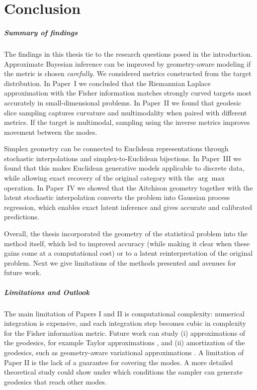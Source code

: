 \chapter{Conclusion}

\paragraph{Summary of findings}
The findings in this thesis tie to the research questions posed in the introduction. Approximate Bayesian inference can be improved by geometry-aware modeling if the metric is chosen \emph{carefully}. We considered metrics constructed from the target distribution.
In Paper~I we concluded that the Riemannian Laplace approximation with the Fisher information matches strongly curved targets most accurately in small-dimensional problems.
In Paper~II we found that geodesic slice sampling captures curvature and multimodality when paired with different metrics. 
If the target is multimodal, sampling using the inverse metrics improves movement between the modes.

Simplex geometry can be connected to Euclidean representations through stochastic interpolations and simplex-to-Euclidean bijections. In Paper~III we found that this makes Euclidean generative models applicable to discrete data, while allowing exact recovery of the original category with the $\arg\max$ operation.
In Paper~IV we showed that the Aitchison geometry together with the latent stochastic interpolation converts the problem into Gaussian process regression, which enables exact latent inference and gives accurate and calibrated predictions.

Overall, the thesis incorporated the geometry of the statistical problem into the method itself, which led to improved accuracy (while making it clear when these gains come at a computational cost) or to a latent reinterpretation of the original problem. Next we give limitations of the methods presented and avenues for future work.

\paragraph{Limitations and Outlook}
The main limitation of Papers I and II is computational complexity: numerical integration is expensive, and each integration step becomes cubic in complexity for the Fisher information metric. Future work can study (i) approximations of the geodesics, for example Taylor approximations \citep{hartmann:2023}, and (ii) amortization of the geodesics, such as geometry-aware variational approximations \citep{chevallier2022exponential}. 
A limitation of Paper II is the lack of a guarantee for covering the modes. A more detailed theoretical study could show under which conditions the sampler can generate geodesics that reach other modes.

